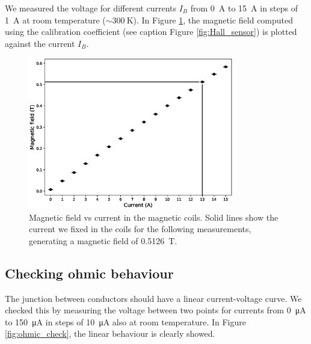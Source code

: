 \documentclass[11pt,a4paper]{article}
\begin{document}
We measured the voltage for different currents $I_B$ from \SI{0}{\ampere} to \SI{15}{\ampere} in steps of \SI{1}{\ampere} at room temperature ($\sim\SI{300}{\kelvin}$). In Figure \ref{fig:magnetic_field}, the magnetic field computed using the calibration coefficient (see caption Figure \ref{fig:Hall_sensor}) is plotted against the current $I_B$.

\begin{figure}[ht]
\centering
\includegraphics[width=0.8\textwidth]{Magnetic_field_vs_current.eps}
\caption{Magnetic field vs current in the magnetic coils. Solid lines show the current we fixed in the coils for the following measurements, generating a magnetic field of \SI{0.5126}{\tesla}.}
\label{fig:magnetic_field}
\end{figure}

\subsection{Checking ohmic behaviour}

The junction between conductors should have a linear current-voltage curve. We checked this by measuring the voltage between two points for currents from \SI{0}{\micro\ampere} to \SI{150}{\micro\ampere} in steps of \SI{10}{\micro\ampere} also at room temperature. In Figure \ref{fig:ohmic_check}, the linear behaviour is clearly showed.
\end{document}
